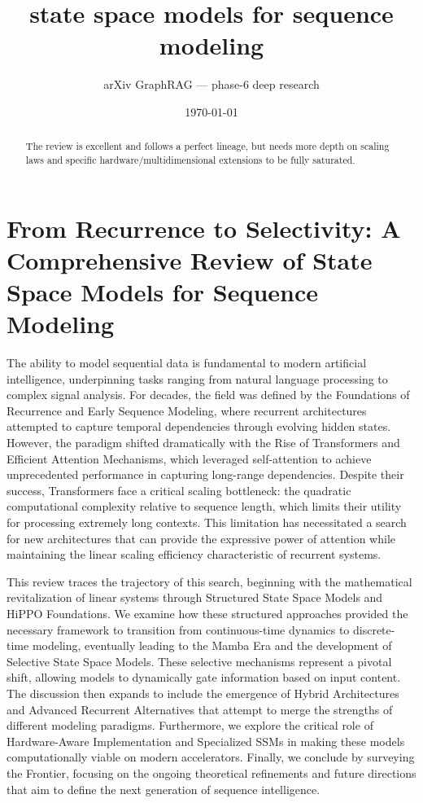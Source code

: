 \documentclass[11pt]{article}
\title{state space models for sequence modeling}
\author{arXiv GraphRAG --- phase-6 deep research}
\date{\today}
\begin{document}
\maketitle

\begin{abstract}
The review is excellent and follows a perfect lineage, but needs more depth on scaling laws and specific hardware/multidimensional extensions to be fully saturated.
\end{abstract}

\section{From Recurrence to Selectivity: A Comprehensive Review of State Space Models for Sequence Modeling}

The ability to model sequential data is fundamental to modern artificial intelligence, underpinning tasks ranging from natural language processing to complex signal analysis. For decades, the field was defined by the Foundations of Recurrence and Early Sequence Modeling, where recurrent architectures attempted to capture temporal dependencies through evolving hidden states. However, the paradigm shifted dramatically with the Rise of Transformers and Efficient Attention Mechanisms, which leveraged self-attention to achieve unprecedented performance in capturing long-range dependencies. Despite their success, Transformers face a critical scaling bottleneck: the quadratic computational complexity relative to sequence length, which limits their utility for processing extremely long contexts. This limitation has necessitated a search for new architectures that can provide the expressive power of attention while maintaining the linear scaling efficiency characteristic of recurrent systems.

This review traces the trajectory of this search, beginning with the mathematical revitalization of linear systems through Structured State Space Models and HiPPO Foundations. We examine how these structured approaches provided the necessary framework to transition from continuous-time dynamics to discrete-time modeling, eventually leading to the Mamba Era and the development of Selective State Space Models. These selective mechanisms represent a pivotal shift, allowing models to dynamically gate information based on input content. The discussion then expands to include the emergence of Hybrid Architectures and Advanced Recurrent Alternatives that attempt to merge the strengths of different modeling paradigms. Furthermore, we explore the critical role of Hardware-Aware Implementation and Specialized SSMs in making these models computationally viable on modern accelerators. Finally, we conclude by surveying the Frontier, focusing on the ongoing theoretical refinements and future directions that aim to define the next generation of sequence intelligence.
\end{document}
